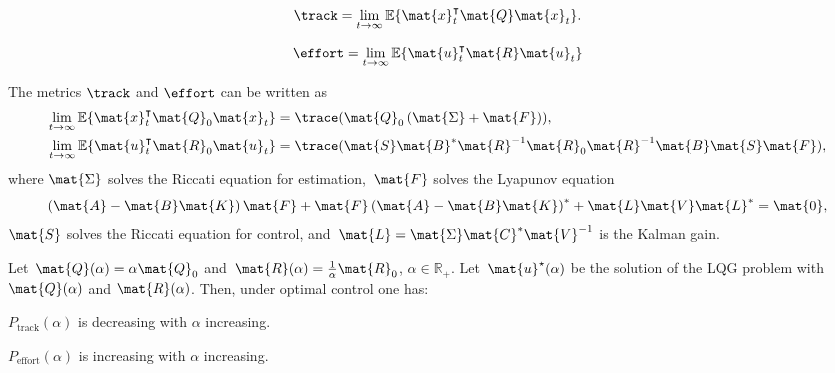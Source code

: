 {\begin{forslides}
        
        
        \begin{equation*}
            \label{eq:ptrack}
            \track=\lim_{t\to \infty}\mathbb{E}\{\mat{x}_t^\intercal \mat{Q}\mat{x}_t\}.
        \end{equation*}
        
        \begin{equation*}
            \label{eq:peffort}
            \effort=\lim_{t\to \infty}\mathbb{E}\{\mat{u}_t^\intercal \mat{R} \mat{u}_t \}
        \end{equation*}
        
        
        \begin{lemma}
            \label{lem:precision}
            The metrics $\track$ and $\effort$ can be written as
            \begin{equation*}
                \begin{aligned}
                    \lim_{t\to \infty}\mathbb{E}\{ \mat{x}_t^\intercal \mat{Q}_0\mat{x}_t\}&=\trace(\mat{Q}_0\left( \mat{\Sigma} +\mat{F}\right)), \\
                    \lim_{t\to \infty}\mathbb{E}\{ \mat{u}_t^\intercal \mat{R}_0\mat{u}_t\}&=\trace(\mat{S}\mat{B}^*\mat{R}^{-1}\mat{R}_0\mat{R}^{-1}\mat{B}\mat{S}\mat{F}),
                \end{aligned}
            \end{equation*}
            where
            $\mat{\Sigma}$ solves the Riccati equation for estimation,~$\mat{F}$ solves the Lyapunov equation
            \begin{equation}
                \label{eq:lyapct}
                \left( \mat{A}-\mat{B}\mat{K}\right)\mat{F}+\mat{F}\left(\mat{A}-\mat{B}\mat{K}\right)^*+\mat{L}\mat{V}\mat{L}^*=\mat{0},
            \end{equation}
            $\mat{S}$ solves the Riccati equation for control, and~$\mat{L}=\mat{\Sigma}\mat{C}^*\mat{V}^{-1}$ is the Kalman gain.
        \end{lemma}
        
        
        \begin{lemma}
            \label{lem:codesigncnt_1}
            Let~$\mat{Q}(\alpha)=\alpha \mat{Q}_0$ and~$\mat{R}(\alpha)=\frac{1}{\alpha}\mat{R}_0$, $\alpha\in \mathbb{R}_+$.
            Let~$\mat{u}^\star(\alpha)$ be the solution of the LQG problem with $\mat{Q}(\alpha)$ and $\mat{R}(\alpha)$.
            Then, under optimal control one has:
            \begin{compactitem}
                \item $P_\mathrm{track}(\alpha)$ is decreasing with $\alpha$
                increasing.
                \item $P_\mathrm{effort}(\alpha)$ is increasing with $\alpha$ increasing.
            \end{compactitem}
        \end{lemma}
        

\end{forslides}}
